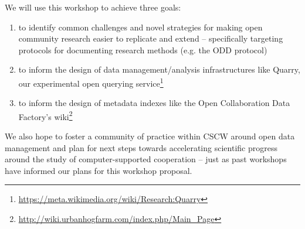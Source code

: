 We will use this workshop to achieve three goals:
\begin{enumerate}
\item to identify common challenges and novel strategies for making open community research easier to replicate and extend -- specifically targeting protocols for documenting research methods (e.g. the ODD protocol\cite{grimm10odd})
\item to inform the design of data management/analysis infrastructures like Quarry, our experimental open querying service\footnote{\url{https://meta.wikimedia.org/wiki/Research:Quarry}}
\item to inform the design of metadata indexes like the Open Collaboration Data Factory's wiki\footnote{\url{http://wiki.urbanhogfarm.com/index.php/Main_Page}}
\end{enumerate}

We also hope to foster a community of practice within CSCW around open data management and plan for next steps towards accelerating scientific progress around the study of computer-supported cooperation -- just as past workshops have informed our plans for this workshop proposal.
